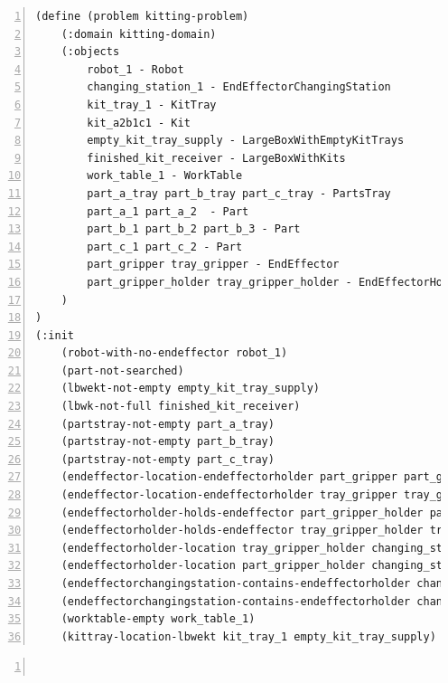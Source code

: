 \begin{center}
\begin{minipage}{.9\paperwidth}
\begin{mylisting}
\begin{Verbatim}[commandchars=\\\{\},fontsize=\scriptsize, numbers=left, numbersep=2pt]
(define (problem kitting-problem)
    (:domain kitting-domain)
    (:objects
        robot_1 - Robot
        changing_station_1 - EndEffectorChangingStation
        kit_tray_1 - KitTray
        kit_a2b1c1 - Kit
        empty_kit_tray_supply - LargeBoxWithEmptyKitTrays
        finished_kit_receiver - LargeBoxWithKits
        work_table_1 - WorkTable
        part_a_tray part_b_tray part_c_tray - PartsTray
        part_a_1 part_a_2  - Part
        part_b_1 part_b_2 part_b_3 - Part
        part_c_1 part_c_2 - Part
        part_gripper tray_gripper - EndEffector
        part_gripper_holder tray_gripper_holder - EndEffectorHolder
    )
)
(:init
    (robot-with-no-endeffector robot_1)
    (part-not-searched)
    (lbwekt-not-empty empty_kit_tray_supply)	
    (lbwk-not-full finished_kit_receiver)		
    (partstray-not-empty part_a_tray)
    (partstray-not-empty part_b_tray)
    (partstray-not-empty part_c_tray)
    (endeffector-location-endeffectorholder part_gripper part_gripper_holder)
    (endeffector-location-endeffectorholder tray_gripper tray_gripper_holder)
    (endeffectorholder-holds-endeffector part_gripper_holder part_gripper)
    (endeffectorholder-holds-endeffector tray_gripper_holder tray_gripper)
    (endeffectorholder-location tray_gripper_holder changing_station_1)
    (endeffectorholder-location part_gripper_holder changing_station_1)
    (endeffectorchangingstation-contains-endeffectorholder changing_station_1 tray_gripper_holder)	
    (endeffectorchangingstation-contains-endeffectorholder changing_station_1 part_gripper_holder)
    (worktable-empty work_table_1)
    (kittray-location-lbwekt kit_tray_1 empty_kit_tray_supply)

\end{Verbatim}
\end{mylisting}
\end{minipage}

\begin{minipage}{.5\paperwidth}
\begin{mylisting}
\begin{Verbatim}[commandchars=\\\{\},fontsize=\scriptsize,  firstnumber=continue, numbers=left, numbersep=2pt]	


\end{Verbatim}
\end{mylisting}
\end{minipage}
\end{center}
